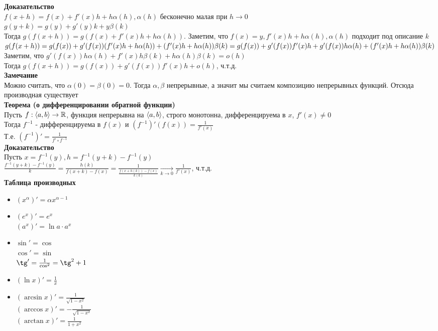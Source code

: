 \documentclass[12pt]{article}
\begin{document}
\textbf{Доказательство}\\
$f(x+h) = f(x)+f'(x)h+h\alpha(h), \alpha(h)$ бесконечно малая при $h \rightarrow 0$\\
$g(y+k) = g(y)+g'(y)k + y\beta(k)$\\
Тогда $g(f(x+h)) = g(f(x)+f'(x)h+h\alpha(h))$. Заметим, что $f(x) = y, f'(x)h+h\alpha(h), \alpha(h)$ подходит под описание $k$\\
$g(f(x+h)) = g(f(x)) + g'(f(x))(f'(x)h+h\alpha(h)) + (f'(x)h+h\alpha(h))\beta(k) = \\
g(f(x)) + g'(f(x))f'(x)h + g'(f(x))h\alpha(h) + (f'(x)h+h\alpha(h))\beta(k)$\\
Заметим, что $g'(f(x))h\alpha(h) + f'(x)h\beta(k)+h\alpha(h)\beta(k) = o(h)$\\
Тогда $g(f(x+h)) = g(f(x))+g'(f(x))f'(x)h + o(h)$, ч.т.д.\\
\textbf{Замечание}\\
Можно считать, что $\alpha(0) = \beta(0) = 0$. Тогда $\alpha, \beta$ непрерывные, а значит мы считаем композицию непрерывных функций. Отсюда производная существует\\
\textbf{Теорема (о дифференцировании обратной функции)}\\
Пусть $f:\langle a, b \rangle \rightarrow \mathbb{R}$, функция непрерывна на $\langle a, b \rangle$, строго монотонна, дифференцируема в $x$, $f'(x) \neq 0$\\
Тогда $f^{-1}$ - дифференцируема в $f(x)$ и $(f^{-1})'(f(x)) = \frac{1}{f'(x)}$\\
Т.е. $(f^{-1})' = \frac{1}{f'\circ f^{-1}}$\\
\textbf{Доказательство}\\
Пусть $x = f^{-1}(y), h = f^{-1}(y+k)-f^{-1}(y)$\\
$\frac{f^{-1}(y+k) - f^{-1}(y)}k = \frac{h(k)}{f(x+k)-f(x)} = \frac{1}{\frac{f(x+h(k))-f(x)}{k(k)}} \xrightarrow[k\rightarrow 0]{} \frac{1}{f'(x)}$, ч.т.д.\\
\textbf{Таблица производных}
\begin{itemize}
    \item $(x^\alpha)' = \alpha x^{\alpha-1}$
    \item $(e^x)' = e^x$\\
    $(a^x)' = \ln a\cdot a^x$
    \item $\sin' = \cos$\\
    $\cos' = \sin$\\
    $\tg' = \frac 1{\cos^2} = \tg^2 + 1$
    \item $(\ln x)'= \frac 1x$
    \item $(\arcsin x)' = \frac{1}{\sqrt{1-x^2}}$\\
    $(\arccos x)' = -\frac{1}{\sqrt{1-x^2}}$\\
    $(\arctan x)' = \frac{1}{1+x^2}$
\end{itemize}
\end{document}
